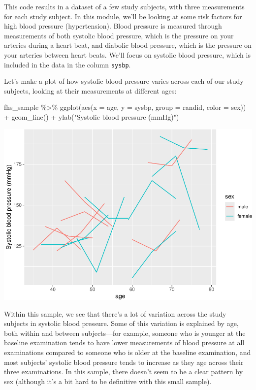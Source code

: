 \documentclass[
]{book}
\newenvironment{Shaded}{\begin{snugshade}}{\end{snugshade}}
\newcommand{\AttributeTok}[1]{\textcolor[rgb]{0.77,0.63,0.00}{#1}}
\newcommand{\FunctionTok}[1]{\textcolor[rgb]{0.00,0.00,0.00}{#1}}
\newcommand{\NormalTok}[1]{#1}
\newcommand{\SpecialCharTok}[1]{\textcolor[rgb]{0.00,0.00,0.00}{#1}}
\newcommand{\StringTok}[1]{\textcolor[rgb]{0.31,0.60,0.02}{#1}}
\begin{document}
This code results in a dataset of a few study subjects, with three measurements
for each study subject. In this module, we'll be looking at some risk factors
for high blood pressure (hypertension). Blood pressure is measured through
measurements of both systolic blood pressure, which is the pressure on your
arteries during a heart beat, and diabolic blood pressure, which is the pressure
on your arteries between heart beats. We'll focus on systolic blood
pressure, which is included in the data in the column \texttt{sysbp}.

Let's make a plot of how systolic blood pressure varies across each of our
study subjects, looking at their measurements at different ages:

\begin{Shaded}
\begin{Highlighting}[]
\NormalTok{fhs\_sample }\SpecialCharTok{\%\textgreater{}\%} 
  \FunctionTok{ggplot}\NormalTok{(}\FunctionTok{aes}\NormalTok{(}\AttributeTok{x =}\NormalTok{ age, }\AttributeTok{y =}\NormalTok{ sysbp, }\AttributeTok{group =}\NormalTok{ randid, }
             \AttributeTok{color =}\NormalTok{ sex)) }\SpecialCharTok{+} 
  \FunctionTok{geom\_line}\NormalTok{() }\SpecialCharTok{+} 
  \FunctionTok{ylab}\NormalTok{(}\StringTok{"Systolic blood pressure (mmHg)"}\NormalTok{)}
\end{Highlighting}
\end{Shaded}

\includegraphics{adv_epi_analysis_files/figure-latex/unnamed-chunk-284-1.pdf}

Within this sample, we see that there's a lot of variation across the study
subjects in systolic blood pressure. Some of this variation is explained by age,
both within and between subjects---for example, someone who is younger at the
baseline examination tends to have lower measurements of blood pressure at all
examinations compared to someone who is older at the baseline examination, and
most subjects' systolic blood pressure tends to increase as they age across
their three examinations. In this sample, there doesn't seem to be a clear
pattern by sex (although it's a bit hard to be definitive with this small
sample).
\end{document}
